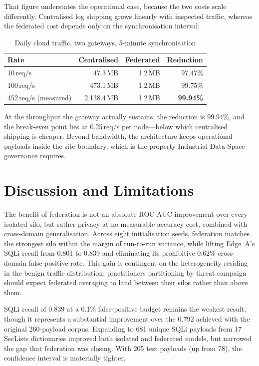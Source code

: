 \documentclass[conference]{IEEEtran}
\begin{document}
That figure understates the operational case, because the two costs scale differently. Centralised log shipping grows linearly with inspected traffic, whereas the federated cost depends only on the synchronisation interval:

\begin{table}[htbp]
\centering
\caption{Daily cloud traffic, two gateways, 5-minute synchronisation}
\label{tab:bandwidth}
\begin{tabular}{@{}lrrr@{}}
\toprule
\textbf{Rate} & \textbf{Centralised} & \textbf{Federated} & \textbf{Reduction} \\ \midrule
10\,req/s & 47.3\,MB & 1.2\,MB & 97.47\% \\
100\,req/s & 473.1\,MB & 1.2\,MB & 99.75\% \\
452\,req/s (measured) & 2{,}138.4\,MB & 1.2\,MB & \textbf{99.94\%} \\ \bottomrule
\end{tabular}
\end{table}

At the throughput the gateway actually sustains, the reduction is 99.94\%, and the break-even point lies at 0.25\,req/s per node---below which centralised shipping is cheaper. Beyond bandwidth, the architecture keeps operational payloads inside the site boundary, which is the property Industrial Data Space governance requires.

\section{Discussion and Limitations}
\label{sec:discussion}
The benefit of federation is not an absolute ROC-AUC improvement over every isolated silo, but rather privacy at no measurable accuracy cost, combined with cross-domain generalisation. Across eight initialisation seeds, federation matches the strongest silo within the margin of run-to-run variance, while lifting Edge~A's SQLi recall from 0.801 to 0.839 and eliminating its prohibitive 0.62\% cross-domain false-positive rate. This gain is contingent on the heterogeneity residing in the benign traffic distribution; practitioners partitioning by threat campaign should expect federated averaging to land between their silos rather than above them.

SQLi recall of 0.839 at a 0.1\% false-positive budget remains the weakest result, though it represents a substantial improvement over the 0.792 achieved with the original 260-payload corpus. Expanding to 681 unique SQLi payloads from 17 SecLists dictionaries improved both isolated and federated models, but narrowed the gap that federation was closing. With 205 test payloads (up from 78), the confidence interval is materially tighter.
\end{document}
